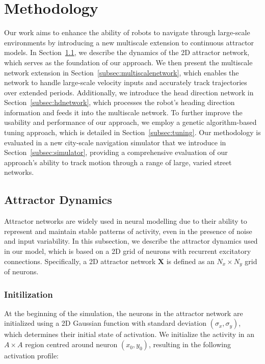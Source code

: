 

\section {Methodology}
\label{sec:methodology}
Our work aims to enhance the ability of robots to navigate through large-scale environments by introducing a new multiscale extension to continuous attractor models. In Section~\ref{subsec:attractdyna}, we describe the dynamics of the 2D attractor network, which serves as the foundation of our approach. We then present the multiscale network extension in \mbox{Section~\ref{subsec:multiscalenetwork}}, which enables the network to handle large-scale velocity inputs and accurately track trajectories over extended periods. Additionally, we introduce the head direction network in Section~\ref{subsec:hdnetwork}, which processes the robot's heading direction information and feeds it into the multiscale network. To further improve the usability and performance of our approach, we employ a genetic algorithm-based tuning approach, which is detailed in Section~\ref{subsec:tuning}. Our methodology is evaluated in a new city-scale navigation simulator that we introduce in Section~\ref{subsec:simulator}, providing a comprehensive evaluation of our approach's ability to track motion through a range of large, varied street networks.


\subsection{Attractor Dynamics}
\label{subsec:attractdyna}

Attractor networks are widely used in neural modelling \cite{yu2019neuroslam} \cite{milford2010persistent} \cite{khona2022attractor} due to their ability to represent and maintain stable patterns of activity, even in the presence of noise and input variability. In this subsection, we describe the attractor dynamics used in our model, which is based on a 2D grid of neurons with recurrent excitatory connections. Specifically, a 2D attractor network $\mathbf{X}$ is defined as an $N_x\times N_y$ grid of neurons.

\subsubsection{\textbf{Initilization}}
%
At the beginning of the simulation, the neurons in the attractor network are initialized using a 2D Gaussian function with standard deviation $(\sigma_x, \sigma_y)$, which determines their initial state of activation. We initialize the activity in an $A\times A$ region centred around neuron $(x_0, y_0)$, resulting in the following activation profile:

